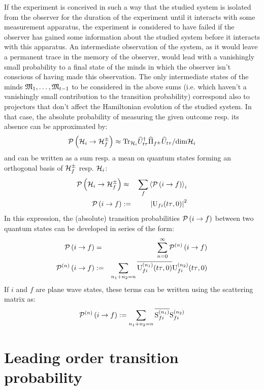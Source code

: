 \documentclass[10pt,a4paper,twoside,openany]{book}
\begin{document}
If the experiment is conceived in such a way that the studied system is isolated from the observer for the duration of the experiment until it interacts with some measurement apparatus, the experiment is considered to have failed if the observer has gained some information about the studied system before it interacts with this apparatus. An intermediate observation of the system, as it would leave a permanent trace in the memory of the observer, would lead with a vanishingly small probability to a final state of the minds in which the observer isn't conscious of having made this observation. The only intermediate states of the minds $\cms_1, \dotsc, \cms_{t - 1}$ to be considered in the above sums (i.e. which haven't a vanishingly small contribution to the transition probability) correspond also to projectors that don't affect the Hamiltonian evolution of the studied system. In that case, the absolute probability of measuring the given outcome resp. its absence can be approximated by:
\begin{equation*}
\TP{\H_i}{\H_f^\pm} \approx \mathrm{Tr}_{\H_i} \dop U_{t \tau} \op \Pi_{f^\pm} \op U_{t \tau} / \mathrm{dim} \H_i
\end{equation*}
and can be written as a sum resp. a mean on quantum states forming an orthogonal basis of $\H_f^\pm$ resp. $\H_i$:
\begin{eqnarray*}
\TP{\H_i}{\H_f^\pm} & \approx & \sum_f \left< \TP i f \right>_i \\
\TP i f & \eqdef & \left| \Um f i {t \tau}{0} \right|^2
\end{eqnarray*}
In this expression, the (absolute) transition probabilities $\TP i f$ between two quantum states can be developed in series of the form:
\begin{eqnarray*}
\TP i f & = & \sum_{n=0}^\infty \TPn i f n \\
\TPn i f n & \eqdef & \sum_{n_1 + n_2 = n} \cc{\Umn f i {n_1} {t \tau}{0}} \Umn f i {n_2} {t \tau}{0}
\end{eqnarray*}
If $i$ and $f$ are plane wave states, these terms can be written using the scattering matrix as:
\begin{equation*}
\TPn i f n \eqdef \sum_{n_1 + n_2 = n} \cc{\Smn f i {n_1}} \Smn f i {n_2}
\end{equation*}

\section{Leading order transition probability}
\end{document}
